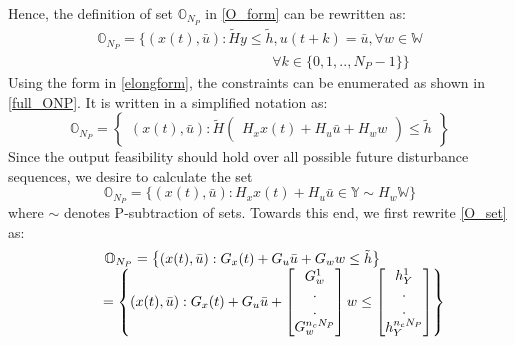 \documentclass[letterpaper, 10 pt, conference]{ieeeconf}  %
\begin{document}
  \fi
  Hence, the definition of set $\mathbb{O}_{N_P}$ in \eqref{O_form} can be rewritten as:
   \begin{equation}
   \begin{matrix}
   \mathbb{O}_{N_P} = \{(x(t),\bar{u}):\tilde{H}y\leq \tilde{h},  u(t+k)=\bar{u},\forall w \in \mathbb{W}  \\ \hspace{150pt} \forall k \in \{0,1,..,N_P-1\} \}
   \end{matrix}
   \label{O_form}
   \end{equation}
Using the form in  \eqref{elongform}, the constraints can be enumerated as shown in \eqref{full_ONP}. It is written in a simplified notation as:
\begin{equation}
\mathbb{O}_{N_P}= \begin{Bmatrix}
(x(t),\bar{u}):
\tilde{H}
\begin{pmatrix}
H_xx(t) +
H_u\bar{u} +  
H_w
w
\end{pmatrix}
\leq
\tilde{h}
\end{Bmatrix}
\label{O_set}
\end{equation}
Since the output feasibility should hold over all possible future disturbance sequences, we desire to calculate the set
\begin{equation}
\mathbb{O}_{N_P}=\{(x(t),\bar{u}): 	H_xx(t) +
H_u\bar{u}\in \mathbb{Y} \sim H_w\mathbb{W}\}
\label{Minkowski}
\end{equation}
where $\sim$ denotes P-subtraction of sets. Towards this end, we first rewrite \eqref{O_set} as: 
  \begin{equation}
  \begin{matrix}
  \hspace{-25pt}
  \mathbb{O}_{N_P}= \begin{Bmatrix}
  (x(t),\bar{u}):
  G_x(t) +
  G_u\bar{u} +  
  G_w
  w
  \leq
  \tilde{h}
  \end{Bmatrix}
  \\
  \hspace{20pt}
 = \begin{Bmatrix}
  (x(t),\bar{u}):
	G_x(t) +
  G_u\bar{u} +  
  \begin{bmatrix}
  G^1_w \\ . \\ . \\ G^{n_cN_P}_w
  \end{bmatrix}
  w
  \leq
  \begin{bmatrix}
  h_Y^1 \\ . \\ . \\ h_Y^{n_cN_P}
  \end{bmatrix}
  \end{Bmatrix}
  \end{matrix}
  \end{equation}
\end{document}
